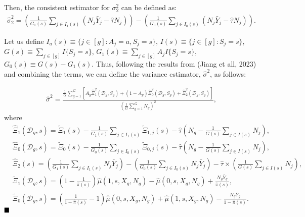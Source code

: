 \documentclass{article}
\renewcommand{\qed}{\hfill\blacksquare}
\begin{document}
Then, the consistent estimator for $\sigma_2^2$  can be defined as:
\begin{align}
\hat{\sigma}^2_2 = \left(\frac{1}{G_1(s)} \sum_{j \in I_1(s)} (N_j \bar{Y}_j - \hat{\tau} N_j) \right) - \left(\frac{1}{G_0(s)} \sum_{j \in I_0(s)} (N_j \bar{Y}_j - \hat{\tau} N_j)\right) \nonumber.
\end{align}

Let us define $I_a(s) \equiv \{j \in [g]: A_j = a, S_j = s \}$, $I(s) \equiv \{j \in [g]: S_j = s \}$, $G(s) \equiv \sum_{j \in [g]}I\{S_j = s\}$, $G_1(s) \equiv \sum_{j \in [g]} A_j I\{S_j = s\}$, $G_0(s) \equiv G(s) - G_1(s)$. Thus, following the results from (Jiang et all, 2023) and combining the terms, we can define the variance estimator, $\hat{\sigma}^2$, as follows: 

\begin{align}
	\hat{\sigma}^2 = \frac{\frac{1}{G} \sum_{g=1}^G \left[A_g\hat{\Xi}_{1}^2(\mathcal D_g, S_g) + (1- A_g) \hat{\Xi}_{0}^2(\mathcal D_g, S_g) + \hat{\Xi}_2^2(\mathcal D_g, S_g) \right]}{(\frac{1}{G}\sum_{g=1}^G N_g)^2}, \nonumber
\end{align}
where 
\begin{align}
	&\hat{\Xi}_{1}(\mathcal D_g, s) = \tilde{\Xi}_{1}(s) - \frac{1}{G_1(s)} \sum_{j \in I_1(s)} \tilde{\Xi}_{1,j}(s)  - \hat{\tau} \left(N_g - \frac{1}{G(s)} \sum_{j \in I(s)} N_j \right)\nonumber, \\
	&\hat{\Xi}_{0}(\mathcal D_g, s) = \tilde{\Xi}_{0}(s) - \frac{1}{G_0(s)} \sum_{j \in I_0(s)} \tilde{\Xi}_{0,j}(s)  - \hat{\tau} \left(N_g - \frac{1}{G(s)} \sum_{j \in I(s)} N_j \right)\nonumber , \\
	& \hat{\Xi}_2(s) = \left(\frac{1}{G_1(s)} \sum_{j \in I_1(s)} N_j \bar{Y}_j\right) - \left(\frac{1}{G_0(s)} \sum_{j \in I_0(s)} N_j \bar{Y}_j\right) - \hat{\tau} \times \left(\frac{1}{G(s)}\sum_{j \in I(s)} N_j \right), \nonumber \\
	&\tilde{\Xi}_{1}(\mathcal D_g, s) = \left(1 - \frac{1}{\hat{\pi}(s)} \right) \hat{\mu}(1,s,X_g,N_g) - \hat{\mu}(0,s,X_g,N_g) + \frac{N_g\bar{Y}_g}{\hat{\pi}(s)}, \nonumber \\
	& \tilde{\Xi}_{0}(\mathcal D_g, s) = \left(\frac{1}{1 - \hat{\pi}(s)} - 1 \right) \hat{\mu}(0,s,X_g,N_g) + \hat{\mu}(1,s,X_g,N_g) - \frac{N_g\bar{Y}_g}{1-\hat{\pi}(s)}. \nonumber
\end{align}
\hfill $\qed$
\end{document}
